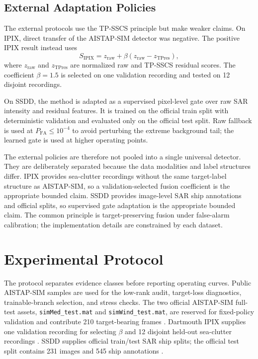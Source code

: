 \documentclass[journal]{IEEEtran}
\begin{document}
\subsection{External Adaptation Policies}

The external protocols use the TP-SSCS principle but make weaker claims. On IPIX, direct transfer of the AISTAP-SIM detector was negative. The positive IPIX result instead uses
\begin{equation}
    S_{\mathrm{IPIX}} = z_{\mathrm{raw}} + \beta
    (z_{\mathrm{raw}} - z_{\mathrm{TPres}}),
\end{equation}
where $z_{\mathrm{raw}}$ and $z_{\mathrm{TPres}}$ are normalized raw and TP-SSCS residual scores. The coefficient $\beta=1.5$ is selected on one validation recording and tested on 12 disjoint recordings.

On SSDD, the method is adapted as a supervised pixel-level gate over raw SAR intensity and residual features. It is trained on the official train split with deterministic validation and evaluated only on the official test split. Raw fallback is used at $P_{\mathrm{FA}} \leq 10^{-4}$ to avoid perturbing the extreme background tail; the learned gate is used at higher operating points.

The external policies are therefore not pooled into a single universal detector. They are deliberately separated because the data modalities and label structures differ. IPIX provides sea-clutter recordings without the same target-label structure as AISTAP-SIM, so a validation-selected fusion coefficient is the appropriate bounded claim. SSDD provides image-level SAR ship annotations and official splits, so supervised gate adaptation is the appropriate bounded claim. The common principle is target-preserving fusion under false-alarm calibration; the implementation details are constrained by each dataset.

\section{Experimental Protocol}

The protocol separates evidence classes before reporting operating curves. Public AISTAP-SIM samples are used for the low-rank audit, target-loss diagnostics, trainable-branch selection, and stress checks. The two official AISTAP-SIM full-test assets, \texttt{simMed\_test.mat} and \texttt{simWind\_test.mat}, are reserved for fixed-policy validation and contribute 210 target-bearing frames \cite{vega2024aistap}. Dartmouth IPIX supplies one validation recording for selecting $\beta$ and 12 disjoint held-out sea-clutter recordings \cite{haykin2002seaclutter,dewind2010database}. SSDD supplies official train/test SAR ship splits; the official test split contains 231 images and 545 ship annotations \cite{wang2019ssdd,zhang2021ssdd}.
\end{document}
